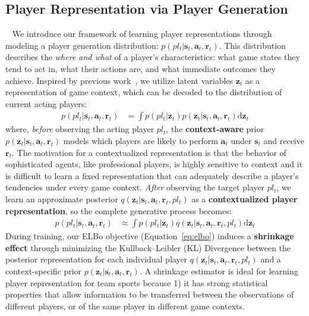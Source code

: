 \documentclass{article}
\newcommand{\latentvariables}{\mathbf{z}}
\newcommand{\state}{\mathbf{s}}
\newcommand{\action}{\mathbf{a}}
\newcommand{\reward}{\boldsymbol{r}}
\newcommand{\player}{pl}
\begin{document}
%
\subsection{Player Representation via Player Generation}~\label{subsec:player-represent-framework}
We introduce our framework of learning player representations through modeling a player generation distribution: $p(\player_{t}|\state_{t},\action_{t},\reward_{t})$. This distribution describes the {\em where and what} of a player's characteristics: what game states they tend to act in, what their actions are, and what immediate outcomes they achieve.
Inspired by previous work~\cite{HausmanEmbedSkills18,zintgraf2019variational,WhitneyACG20}, we utilize latent variables $\latentvariables_{t}$ as a representation of game context, which can be decoded to the distribution of current acting players:
\begin{align}
    p(\player_{t}|\state_{t},\action_{t},\reward_{t}) & =  \int p(\player_{t}|\latentvariables_{t})p(\latentvariables_{t}|\state_{t},\action_{t},\reward_{t}) \mathrm{d}\latentvariables_{t}
\end{align}
where, {\it before} observing the acting player $\player_{t}$, the {\bf context-aware} prior \space $p(\latentvariables_{t}|\state_{t},\action_{t},\reward_{t})$ models which players are likely to perform $\action_{t}$ under $\state_{t}$ and receive $\reward_{t}$. 
The motivation for a contextualized representation is that the behavior of sophisticated agents, like professional players, is highly sensitive to context and it is difficult to learn a fixed representation that can adequately describe a player's tendencies under every game context.
{\it After} observing the target player $\player_{t}$, we 
learn an approximate posterior $q(\latentvariables_{t}|\state_{t},\action_{t},\reward_{t},\player_{t})$ as a {\bf contextualized player representation}, so the complete generative process becomes:
\begin{align}
    p(\player_{t}|\state_{t},\action_{t},\reward_{t}) 
    & \approx \int p(\player_{t}|\latentvariables_{t})q(\latentvariables_{t}|\state_{t},\action_{t},\reward_{t},\player_{t}) \mathrm{d}\latentvariables_{t} \label{eq:generation}
\end{align}
During training, our ELBo objective (Equation~\ref{eq:elbo}) induces a {\bf shrinkage effect} through minimizing the Kullback–Leibler (KL) Divergence between the posterior representation for each individual player $q(\latentvariables_{t}|\state_{t},\action_{t},\reward_{t},\player_{t})$ and a context-specific prior $p(\latentvariables_{t}|\state_{t},\action_{t},\reward_{t})$. A shrinkage estimator is ideal for learning player representation for team sports because 1) it has strong statistical properties that allow information to be transferred between the observations of different players, or of the same player in different game contexts. 
\end{document}
